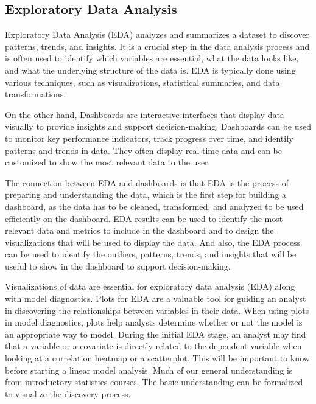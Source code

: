 \documentclass[print]{nuthesis}
\begin{document}
\hypertarget{exploratory-data-analysis}{%
\subsection{Exploratory Data Analysis}\label{exploratory-data-analysis}}

Exploratory Data Analysis (EDA) analyzes and summarizes a dataset to discover patterns, trends, and insights. It is a crucial step in the data analysis process and is often used to identify which variables are essential, what the data looks like, and what the underlying structure of the data is. EDA is typically done using various techniques, such as visualizations, statistical summaries, and data transformations.

On the other hand, Dashboards are interactive interfaces that display data visually to provide insights and support decision-making. Dashboards can be used to monitor key performance indicators, track progress over time, and identify patterns and trends in data. They often display real-time data and can be customized to show the most relevant data to the user.

The connection between EDA and dashboards is that EDA is the process of preparing and understanding the data, which is the first step for building a dashboard, as the data has to be cleaned, transformed, and analyzed to be used efficiently on the dashboard. EDA results can be used to identify the most relevant data and metrics to include in the dashboard and to design the visualizations that will be used to display the data. And also, the EDA process can be used to identify the outliers, patterns, trends, and insights that will be useful to show in the dashboard to support decision-making.

Visualizations of data are essential for exploratory data analysis (EDA) along with model diagnostics.
Plots for EDA are a valuable tool for guiding an analyst in discovering the relationships between variables in their data.
When using plots in model diagnostics, plots help analysts determine whether or not the model is an appropriate way to model.
During the initial EDA stage, an analyst may find that a variable or a covariate is directly related to the dependent variable when looking at a correlation heatmap or a scatterplot.
This will be important to know before starting a linear model analysis.
Much of our general understanding is from introductory statistics courses.
The basic understanding can be formalized to visualize the discovery process.
\end{document}
